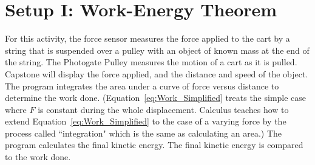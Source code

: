 \documentclass[main.tex]{subfiles}
\begin{document}
\section{Setup I: Work-Energy Theorem}
For this activity, the force sensor measures the force applied to the cart by a string that is suspended over a pulley with an object of known mass at the end of the string. The Photogate Pulley measures the motion of a cart as it is pulled. Capstone will display the force applied, and the distance and speed of the object. The program integrates the area under a curve of force versus distance to determine the work done. (Equation~\eqref{eq:Work_Simplified} treats the simple case where $F$ is constant during the whole displacement. Calculus teaches how to extend Equation~\eqref{eq:Work_Simplified} to the case of a varying force by the process called ``integration" which is the same as calculating an area.) The program calculates the final kinetic energy. The final kinetic energy is compared to the work done.
\end{document}
